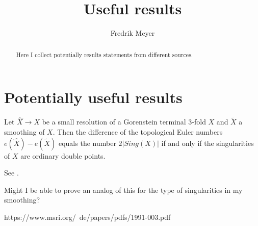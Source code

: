 \documentclass[11pt, english]{article}
\begin{document}
\title{Useful results}
\author{Fredrik Meyer}
\maketitle 

\begin{abstract}
 Here I collect potentially results statements from different sources.
\end{abstract}

\section{Potentially useful results}

\begin{prop}
Let $\widehat X \to X$ be a small resolution of a Gorenstein terminal 3-fold $X$ and $\widetilde X$ a smoothing of $X$. Then the difference of the topological Euler numbers $e(\widehat X) - e(\widetilde X)$ equals the number $2\lvert Sing(X) \rvert$ if and only if the singularities of $X$ are ordinary double points.
\end{prop}
See \cite{wang_connectedness}.

Might I be able to prove an analog of this for the type of singularities in my smoothing?


https://www.msri.org/~de/papers/pdfs/1991-003.pdf



\end{document}
